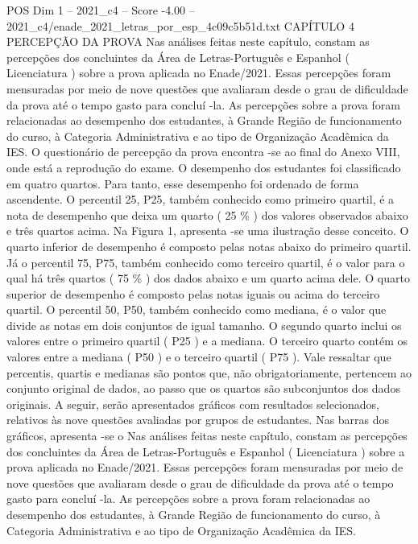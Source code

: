 \begin{textsample}{POS Dim 1 – 2021\_c4 – Score -4.00 – 2021\_c4/enade\_2021\_letras\_por\_esp\_4c09c5b51d.txt}  \label{ex:f1_pos_373}
CAPÍTULO 4 PERCEPÇÃO DA PROVA Nas análises feitas neste capítulo, constam as percepções dos concluintes da Área de Letras-Português e Espanhol ( Licenciatura ) sobre a prova aplicada no Enade/2021.
Essas percepções foram mensuradas por meio de nove questões que avaliaram desde o grau de dificuldade da prova até o tempo gasto para concluí -la.
As percepções sobre a prova foram relacionadas ao desempenho dos estudantes, à Grande Região de funcionamento do curso, à Categoria Administrativa e ao tipo de Organização Acadêmica da IES.
O questionário de percepção da prova encontra -se ao final do Anexo VIII, onde está a reprodução do exame.
O desempenho dos estudantes foi classificado em quatro quartos.
Para tanto, esse desempenho foi ordenado de forma ascendente.
O percentil 25, P25, também conhecido como primeiro quartil, é a nota de desempenho que deixa um quarto ( 25 \% ) dos valores observados abaixo e três quartos acima.
Na Figura 1, apresenta -se uma ilustração desse conceito.
O quarto inferior de desempenho é composto pelas notas abaixo do primeiro quartil.
Já o percentil 75, P75, também conhecido como terceiro quartil, é o valor para o qual há três quartos ( 75 \% ) dos dados abaixo e um quarto acima dele.
O quarto superior de desempenho é composto pelas notas iguais ou acima do terceiro quartil.
O percentil 50, P50, também conhecido como mediana, é o valor que divide as notas em dois conjuntos de igual tamanho.
O segundo quarto inclui os valores entre o primeiro quartil ( P25 ) e a mediana.
O terceiro quarto contém os valores entre a mediana ( P50 ) e o terceiro quartil ( P75 ).
Vale ressaltar que percentis, quartis e medianas são pontos que, não obrigatoriamente, pertencem ao conjunto original de dados, ao passo que os quartos são subconjuntos dos dados originais.
A seguir, serão apresentados gráficos com resultados selecionados, relativos às nove questões avaliadas por grupos de estudantes.
Nas barras dos gráficos, apresenta -se o Nas análises feitas neste capítulo, constam as percepções dos concluintes da Área de Letras-Português e Espanhol ( Licenciatura ) sobre a prova aplicada no Enade/2021.
Essas percepções foram mensuradas por meio de nove questões que avaliaram desde o grau de dificuldade da prova até o tempo gasto para concluí -la.
As percepções sobre a prova foram relacionadas ao desempenho dos estudantes, à Grande Região de funcionamento do curso, à Categoria Administrativa e ao tipo de Organização Acadêmica da IES.

\end{textsample}
